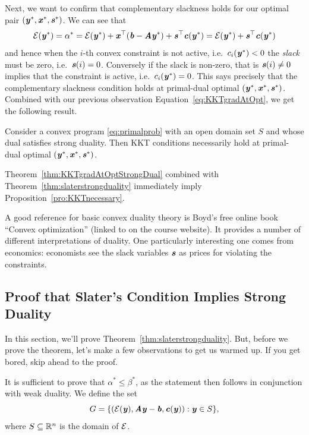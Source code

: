 Next, we want to confirm that complementary slackness holds for our
optimal pair $(\yy^*, \xx^*, \ss^*)$.
We can see that
\begin{equation*}\energy(\yy^*) =  \alpha^* = \energy(\yy^*) + \xx^{\trp}(\bb - \AA\yy^*) + \ss^{\trp}\cc(\yy^*) = \energy(\yy^*) + \ss^{\trp}\cc(\yy^*) \end{equation*}
and hence when the $i$-th convex constraint is not active, i.e.\ $c_i(\yy^*) < 0$ the \emph{slack} must be zero, i.e.\ $\ss(i) = 0$.
Conversely if the slack is non-zero, that is $\ss(i) \neq 0$ implies
that the constraint is active, i.e.\ $c_i(\yy^*) = 0$.
This says precisely that the complementary slackness condition holds
at primal-dual optimal $(\yy^*, \xx^*, \ss^*)$.
Combined with our previous observation
Equation~\eqref{eq:KKTgradAtOpt}, we get the following result.

\begin{theorem}
  \label{thm:KKTgradAtOptStrongDual}
  Consider a convex program \eqref{eq:primalprob} with an open domain
  set $S$ and whose dual satisfies strong duality.  
Then  KKT conditions necessarily hold at primal-dual
  optimal $(\yy^*, \xx^*, \ss^*)$.
\end{theorem}

Theorem~\ref{thm:KKTgradAtOptStrongDual} combined with
Theorem~\ref{thm:slaterstrongduality} immediately
imply Proposition~\ref{pro:KKTnecessary}.

A good reference for basic convex duality theory is Boyd's free online book ``Convex
optimization'' (linked to on the course website).
It provides a number of different interpretations of duality. One
particularly interesting one comes from economics:
economists see the slack variables $\ss$ as prices for violating the constraints.


\subsection{Proof that Slater's Condition Implies Strong Duality}

In this section, we'll prove Theorem~\ref{thm:slaterstrongduality}.
But, before we prove the theorem, let's make a few observations to get us
warmed up. If you get bored, skip ahead to the proof.

It is sufficient to prove that $\alpha^* \leq \beta^*$, as the statement then follows in conjunction with weak duality.
We define the set
\begin{equation*} G = \{(\energy(\yy), \AA\yy - \bb, \cc(\yy)) : \yy \in S \}, \end{equation*}
where $S \subseteq \R^n$ is the domain of $\energy$.


